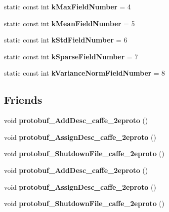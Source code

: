 \begin{DoxyCompactItemize}
static const int {\bfseries k\+Max\+Field\+Number} = 4
\item 
\mbox{\label{classcaffe_1_1_filler_parameter_a3c369e64f9f2410a68e14383d5f2a923}} 
static const int {\bfseries k\+Mean\+Field\+Number} = 5
\item 
\mbox{\label{classcaffe_1_1_filler_parameter_a59b1a6b817d50a889f775172dde75894}} 
static const int {\bfseries k\+Std\+Field\+Number} = 6
\item 
\mbox{\label{classcaffe_1_1_filler_parameter_a32d61b637bdbc7a88cfd2bca8f264d8c}} 
static const int {\bfseries k\+Sparse\+Field\+Number} = 7
\item 
\mbox{\label{classcaffe_1_1_filler_parameter_a31d69fc11c678a0b3ef091f045b198ca}} 
static const int {\bfseries k\+Variance\+Norm\+Field\+Number} = 8
\end{DoxyCompactItemize}
\subsection*{Friends}
\begin{DoxyCompactItemize}
\item 
\mbox{\label{classcaffe_1_1_filler_parameter_a2670a9c8ffd0e5105cf7522cd6f8613d}} 
void {\bfseries protobuf\+\_\+\+Add\+Desc\+\_\+caffe\+\_\+2eproto} ()
\item 
\mbox{\label{classcaffe_1_1_filler_parameter_a7f145bddbdde78003d27e42c7e003d23}} 
void {\bfseries protobuf\+\_\+\+Assign\+Desc\+\_\+caffe\+\_\+2eproto} ()
\item 
\mbox{\label{classcaffe_1_1_filler_parameter_a026784a8e4e76f1b4daf9d033d2ece83}} 
void {\bfseries protobuf\+\_\+\+Shutdown\+File\+\_\+caffe\+\_\+2eproto} ()
\item 
\mbox{\label{classcaffe_1_1_filler_parameter_a2670a9c8ffd0e5105cf7522cd6f8613d}} 
void {\bfseries protobuf\+\_\+\+Add\+Desc\+\_\+caffe\+\_\+2eproto} ()
\item 
\mbox{\label{classcaffe_1_1_filler_parameter_a7f145bddbdde78003d27e42c7e003d23}} 
void {\bfseries protobuf\+\_\+\+Assign\+Desc\+\_\+caffe\+\_\+2eproto} ()
\item 
\mbox{\label{classcaffe_1_1_filler_parameter_a026784a8e4e76f1b4daf9d033d2ece83}} 
void {\bfseries protobuf\+\_\+\+Shutdown\+File\+\_\+caffe\+\_\+2eproto} ()
\end{DoxyCompactItemize}


